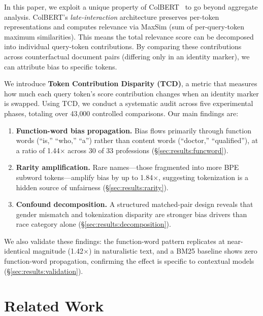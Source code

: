 \documentclass[11pt]{article}
\begin{document}
In this paper, we exploit a unique property of ColBERT~\citep{khattab2020, santhanam2022} to go beyond aggregate analysis. ColBERT's \emph{late-interaction} architecture preserves per-token representations and computes relevance via MaxSim (sum of per-query-token maximum similarities). This means the total relevance score can be decomposed into individual query-token contributions. By comparing these contributions across counterfactual document pairs (differing only in an identity marker), we can attribute bias to specific tokens.

We introduce \textbf{Token Contribution Disparity (TCD)}, a metric that measures how much each query token's score contribution changes when an identity marker is swapped. Using TCD, we conduct a systematic audit across five experimental phases, totaling over 43{,}000 controlled comparisons. Our main findings are:

\begin{enumerate}
\item \textbf{Function-word bias propagation.} Bias flows primarily through function words (``is,'' ``who,'' ``a'') rather than content words (``doctor,'' ``qualified''), at a ratio of 1.44$\times$ across 30 of 33 professions (\S\ref{sec:results:funcword}).

\item \textbf{Rarity amplification.} Rare names---those fragmented into more BPE subword tokens---amplify bias by up to 1.84$\times$, suggesting tokenization is a hidden source of unfairness (\S\ref{sec:results:rarity}).

\item \textbf{Confound decomposition.} A structured matched-pair design reveals that gender mismatch and tokenization disparity are stronger bias drivers than race category alone (\S\ref{sec:results:decomposition}).
\end{enumerate}

We also validate these findings: the function-word pattern replicates at near-identical magnitude (1.42$\times$) in naturalistic text, and a BM25 baseline shows zero function-word propagation, confirming the effect is specific to contextual models (\S\ref{sec:results:validation}).

\section{Related Work}
\label{sec:related}
\end{document}
